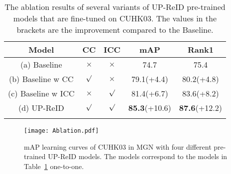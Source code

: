 \documentclass[10pt,twocolumn,letterpaper]{article}
\begin{document}
\vspace{-2mm}
\begin{table}[h!]
\caption{The ablation results of several variants of UP-ReID pre-trained models that are fine-tuned on CUHK03. The values in the brackets are the improvement compared to the Baseline.}
\vspace{-2mm}
\small
    \centering
    \begin{tabular}{c|cc|cc}
        \shline
        Model & CC & ICC & mAP & Rank1 \\
        \hline
        (a) Baseline & $\times$ & $\times$ & 74.7 & 75.4 \\
        (b) Baseline w CC & $\surd$ & $\times$ & 79.1(+4.4) & 80.2(+4.8) \\
        (c) Baseline w ICC & $\times$ & $\surd$ & 81.4(+6.7) & 83.6(+8.2) \\
        (d) UP-ReID & $\surd$ & $\surd$ & \textbf{85.3}(+10.6) & \textbf{87.6}(+12.2) \\
        \shline
    \end{tabular}
    \label{tab: effectiveness of CC and ICC.}
\end{table}

\vspace{-2mm}
\begin{figure}[h!]
    \centering
    \texttt{[image: Ablation.pdf]}
    \setlength{\abovecaptionskip}{7pt}
    \vspace{-5mm}
    \caption{mAP learning curves of CUHK03 in MGN with four different pre-trained UP-ReID models. The models correspond to the models in Table~\ref{tab: effectiveness of CC and ICC.} one-to-one.}
    \label{fig: ablation}
\end{figure}



\end{document}
